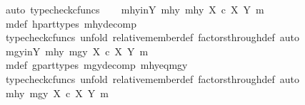 \begin{isabellebody}
\ {\isacharparenleft}{\kern0pt}auto{\isacharcomma}{\kern0pt}\ typecheck{\isacharunderscore}{\kern0pt}cfuncs{\isacharparenright}{\kern0pt}\isanewline
\isanewline
\ \ \isamarkupfalse%
\ mhy{\isacharunderscore}{\kern0pt}in{\isacharunderscore}{\kern0pt}Y{\isacharcolon}{\kern0pt}\ {\isachardoublequoteopen}{\isasymlangle}mhy{}{\isacharcomma}{\kern0pt}\ mhy{}{\isasymrangle}\ {\isasymin}\isactrlbsub X\ {\isasymtimes}\isactrlsub c\ X\isactrlesub \ {\isacharparenleft}{\kern0pt}Y{\isacharcomma}{\kern0pt}\ m{\isacharparenright}{\kern0pt}{\isachardoublequoteclose}\isanewline
\ \ \ \ \isamarkupfalse%
\ m{\isacharunderscore}{\kern0pt}def\ h{\isacharunderscore}{\kern0pt}part{\isacharunderscore}{\kern0pt}types\ mhy{\isacharunderscore}{\kern0pt}decomp\isanewline
\ \ \ \ \isamarkupfalse%
\ {\isacharparenleft}{\kern0pt}typecheck{\isacharunderscore}{\kern0pt}cfuncs{\isacharcomma}{\kern0pt}\ unfold\ relative{\isacharunderscore}{\kern0pt}member{\isacharunderscore}{\kern0pt}def{}\ factors{\isacharunderscore}{\kern0pt}through{\isacharunderscore}{\kern0pt}def{}{\isacharcomma}{\kern0pt}\ auto{\isacharparenright}{\kern0pt}\isanewline
\ \ \isamarkupfalse%
\ mgy{\isacharunderscore}{\kern0pt}in{\isacharunderscore}{\kern0pt}Y{\isacharcolon}{\kern0pt}\ {\isachardoublequoteopen}{\isasymlangle}mhy{}{\isacharcomma}{\kern0pt}\ mgy{}{\isasymrangle}\ {\isasymin}\isactrlbsub X\ {\isasymtimes}\isactrlsub c\ X\isactrlesub \ {\isacharparenleft}{\kern0pt}Y{\isacharcomma}{\kern0pt}\ m{\isacharparenright}{\kern0pt}{\isachardoublequoteclose}\isanewline
\ \ \ \ \isamarkupfalse%
\ m{\isacharunderscore}{\kern0pt}def\ g{\isacharunderscore}{\kern0pt}part{\isacharunderscore}{\kern0pt}types\ mgy{\isacharunderscore}{\kern0pt}decomp\ mhy{}{\isacharunderscore}{\kern0pt}eq{\isacharunderscore}{\kern0pt}mgy{}\isanewline
\ \ \ \ \isamarkupfalse%
\ {\isacharparenleft}{\kern0pt}typecheck{\isacharunderscore}{\kern0pt}cfuncs{\isacharcomma}{\kern0pt}\ unfold\ relative{\isacharunderscore}{\kern0pt}member{\isacharunderscore}{\kern0pt}def{}\ factors{\isacharunderscore}{\kern0pt}through{\isacharunderscore}{\kern0pt}def{}{\isacharcomma}{\kern0pt}\ auto{\isacharparenright}{\kern0pt}\isanewline
\isanewline
\ \ \isamarkupfalse%
\ {\isachardoublequoteopen}{\isasymlangle}mhy{}{\isacharcomma}{\kern0pt}\ mgy{}{\isasymrangle}\ {\isasymin}\isactrlbsub X\ {\isasymtimes}\isactrlsub c\ X\isactrlesub \ {\isacharparenleft}{\kern0pt}Y{\isacharcomma}{\kern0pt}\ m{\isacharparenright}{\kern0pt}{\isachardoublequoteclose}\isanewline

\end{isabellebody}
